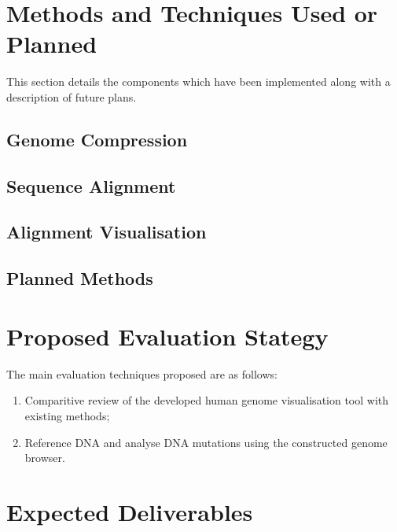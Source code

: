 \documentclass{csfyp}
\begin{document}
\section{Methods and Techniques Used or Planned}

This section details the components which have been implemented along with a description of future plans.

\subsection{Genome Compression}

\subsection{Sequence Alignment}

\subsection{Alignment Visualisation}

\subsection{Planned Methods}


\section{Proposed Evaluation Stategy}

The main evaluation techniques proposed are as follows:

\begin{enumerate}[nolistsep]

  \item Comparitive review of the developed human genome visualisation tool with existing methods;

  \item Reference DNA and analyse DNA mutations using the constructed genome browser.

\end{enumerate}


\section{Expected Deliverables}
\end{document}
